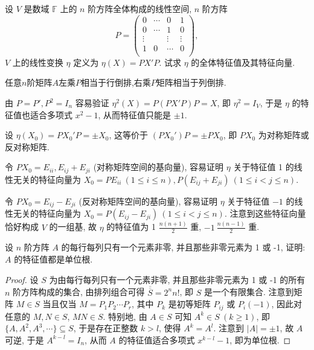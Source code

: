 \documentclass[../../main.tex]{subfiles}
\begin{document}
\begin{example}
设 \( V \) 是数域 \( \mathbb{F} \) 上的 \( n \) 阶方阵全体构成的线性空间, \( n \) 阶方阵
\[
P=\left( \begin{matrix}
0&		\cdots&		0&		1\\
0&		\cdots&		1&		0\\
\vdots&		&		\vdots&		\vdots\\
1&		0&		\cdots&		0\\
\end{matrix} \right) ,
\]
\( V \) 上的线性变换 \( \eta \) 定义为 \( \eta(X) = PX'P \). 试求 \( \eta \) 的全体特征值及其特征向量.
\end{example}
\begin{note}
任意$n$阶矩阵$A$左乘$P$相当于行倒排,右乘$P$矩阵相当于列倒排.
\end{note}
\begin{solution}
由 \( P = P', P^2 = I_n \) 容易验证 \( \eta^2(X) = P(PX'P)P = X \), 即 \( \eta^2 = I_V \), 于是 \( \eta \) 的特征值也适合多项式 \( x^2 - 1 \), 从而特征值只能是 \( \pm 1 \).

设 \( \eta(X_0) = PX_0'P = \pm X_0 \), 这等价于 \( (PX_0')P = \pm PX_0 \), 即 \( PX_0 \) 为对称矩阵或反对称矩阵. 

令 \( PX_0 = E_{ii}, E_{ij} + E_{ji} \) (对称矩阵空间的基向量), 容易证明 \( \eta \) 关于特征值 1 的线性无关的特征向量为 \( X_0 = PE_{ii} \ (1 \leq i \leq n), P(E_{ij} + E_{ji}) \ (1 \leq i < j \leq n) \).

令 \( PX_0 = E_{ij} - E_{ji} \) (反对称矩阵空间的基向量), 容易证明 \( \eta \) 关于特征值 \( -1 \) 的线性无关的特征向量为 \( X_0 = P(E_{ij} - E_{ji}) \ (1 \leq i < j \leq n) \). 注意到这些特征向量恰好构成 \( V \) 的一组基, 故 \( \eta \) 的特征值为 1 \( \frac{n(n+1)}{2} \) 重, \( -1 \ \frac{n(n-1)}{2} \) 重.
\end{solution}

\begin{example}
设 \( n \) 阶方阵 \( A \) 的每行每列只有一个元素非零, 并且那些非零元素为 1 或 -1, 证明: \( A \) 的特征值都是单位根.
\end{example}
\begin{proof}
设 \( S \) 为由每行每列只有一个元素非零, 并且那些非零元素为 1 或 -1 的所有 \( n \) 阶方阵构成的集合, 由排列组合可得 \( \overline{\overline{S}} = 2^n n! \), 即 \( S \) 是一个有限集合. 注意到矩阵 \( M \in S \) 当且仅当 \( M = P_1 P_2 \cdots P_r \), 其中 \( P_k \) 是初等矩阵 \( P_{ij} \) 或 \( P_i(-1) \), 因此对任意的 \( M, N \in S \), \( MN \in S \). 特别地, 由 \( A \in S \) 可知 \( A^k \in S \ (k \geq 1) \), 即 \( \{A, A^2, A^3, \cdots\} \subseteq S \), 于是存在正整数 \( k > l \), 使得 \( A^k = A^l \). 注意到 \( |A| = \pm 1 \), 故 \( A \) 可逆, 于是 \( A^{k-l} = I_n \), 从而 \( A \) 的特征值适合多项式 \( x^{k-l} - 1 \), 即为单位根.
\end{proof}
\end{document}
